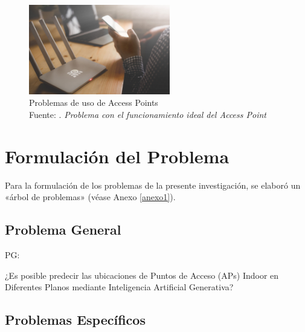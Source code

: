 \begin{figure}[h]
	\begin{center}
		\includegraphics[width=0.55\textwidth]{1/figures/access-point-1.jpeg}
		\caption[Problemas de uso de Access Points]{Problemas de uso de Access Points\\
		Fuente: \cite{ot_napit2017ap}. \textit{Problema con el funcionamiento ideal del Access Point}}
		\label{1:fig2}
	\end{center}
\end{figure}

\section{Formulación del Problema}
Para la formulación de los problemas de la presente investigación, se elaboró un «árbol de problemas» (véase Anexo \ref{anexo1}).

\subsection{Problema General}
PG: \newcommand{\ProblemaGeneral}{
¿Es posible predecir las ubicaciones de Puntos de Acceso (APs) Indoor en Diferentes Planos  mediante Inteligencia Artificial Generativa?
}
\ProblemaGeneral
\subsection{Problemas Específicos}
\newcommand{\Pbone}{
¿Cómo se puede modelar de manera efectiva la distribución espacial de usuarios y obstáculos en un entorno interior para predecir la cobertura inalámbrica?
}
\newcommand{\Pbtwo}{
¿Qué enfoques de inteligencia artificial generativa son más adecuados para generar ubicaciones óptimas de APs en entornos interiores?
}
\newcommand{\Pbthree}{
¿Cómo puedo encontrar una base de datos eficiente y robusta que almacene información detallada y precisa sobre la infraestructura de edificios y características de entornos indoor?
}
\newcommand{\Pbfour}{
¿Cuáles son las métricas y metodologías de evaluación más adecuadas para medir la eficiencia y efectividad de las predicciones de ubicaciones óptimas de puntos de acceso (APs) generadas por modelos de inteligencia artificial generativa en entornos indoor?
}

